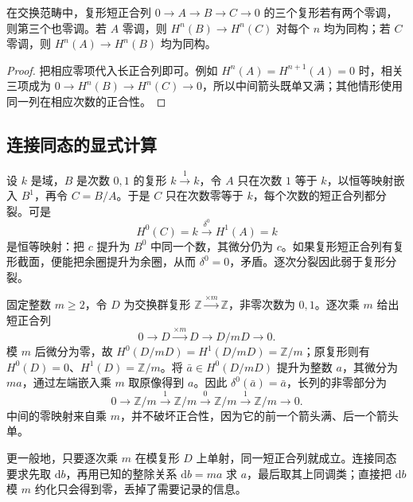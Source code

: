\begin{corollary}\label{b4:cor:acyclic-two-of-three}
在交换范畴中，复形短正合列 \(0\to A\to B\to C\to0\) 的三个复形若有两个零调，则第三个也零调。若 \(A\) 零调，则 \(H^n(B)\to H^n(C)\) 对每个 \(n\) 均为同构；若 \(C\) 零调，则 \(H^n(A)\to H^n(B)\) 均为同构。
\end{corollary}
\begin{proof}
把相应零项代入长正合列即可。例如 \(H^n(A)=H^{n+1}(A)=0\) 时，相关三项成为 \(0\to H^n(B)\to H^n(C)\to0\)，所以中间箭头既单又满；其他情形使用同一列在相应次数的正合性。
\end{proof}

\subsection{连接同态的显式计算}
\label{b4:subsec:0503:03}

\begin{example}\label{b4:exm:connecting-nonzero}
设 \(k\) 是域，\(B\) 是次数 \(0,1\) 的复形 \(k\xrightarrow{1}k\)，令 \(A\) 只在次数 \(1\) 等于 \(k\)，以恒等映射嵌入 \(B^1\)，再令 \(C=B/A\)。于是 \(C\) 只在次数零等于 \(k\)，每个次数的短正合列都分裂。可是
\[
H^0(C)=k\xrightarrow{\delta^0}H^1(A)=k
\]
是恒等映射：把 \(c\) 提升为 \(B^0\) 中同一个数，其微分仍为 \(c\)。如果复形短正合列有复形截面，便能把余圈提升为余圈，从而 \(\delta^0=0\)，矛盾。逐次分裂因此弱于复形分裂。
\end{example}

\begin{example}\label{b4:exm:connecting-divisibility}
固定整数 \(m\ge2\)，令 \(D\) 为交换群复形 \(\mathbb Z\xrightarrow{\times m}\mathbb Z\)，非零次数为 \(0,1\)。逐次乘 \(m\) 给出短正合列
\[
0\longrightarrow D\xrightarrow{\times m}D\longrightarrow D/mD\longrightarrow0.
\]
模 \(m\) 后微分为零，故 \(H^0(D/mD)=H^1(D/mD)=\mathbb Z/m\)；原复形则有 \(H^0(D)=0\)、\(H^1(D)=\mathbb Z/m\)。将 \(\bar a\in H^0(D/mD)\) 提升为整数 \(a\)，其微分为 \(ma\)，通过左端嵌入乘 \(m\) 取原像得到 \(a\)。因此 \(\delta^0(\bar a)=\bar a\)，长列的非零部分为
\[
0\longrightarrow\mathbb Z/m\xrightarrow{1}\mathbb Z/m
\xrightarrow{0}\mathbb Z/m\xrightarrow{1}\mathbb Z/m\longrightarrow0.
\]
中间的零映射来自乘 \(m\)，并不破坏正合性，因为它的前一个箭头满、后一个箭头单。
\end{example}

更一般地，只要逐次乘 \(m\) 在模复形 \(D\) 上单射，同一短正合列就成立。连接同态要求先取 \(\mathrm{d}b\)，再用已知的整除关系 \(\mathrm{d}b=ma\) 求 \(a\)，最后取其上同调类；直接把 \(\mathrm{d}b\) 模 \(m\) 约化只会得到零，丢掉了需要记录的信息。
